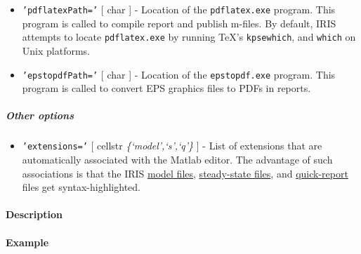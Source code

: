\begin{itemize}
\item
  \texttt{'pdflatexPath='} {[} char {]} - Location of the
  \texttt{pdflatex.exe} program. This program is called to compile
  report and publish m-files. By default, IRIS attempts to locate
  \texttt{pdflatex.exe} by running TeX's \texttt{kpsewhich}, and
  \texttt{which} on Unix platforms.
\item
  \texttt{'epstopdfPath='} {[} char {]} - Location of the
  \texttt{epstopdf.exe} program. This program is called to convert EPS
  graphics files to PDFs in reports.
\end{itemize}

\subparagraph{Other options}\label{other-options}

\begin{itemize}
\itemsep1pt\parskip0pt
\item
  \texttt{'extensions='} {[} cellstr \textbar{}
  \emph{\{`model',`s',`q'\}} {]} - List of extensions that are
  automatically associated with the Matlab editor. The advantage of such
  associations is that the IRIS \href{modellang/Contents}{model files},
  \href{sstatelang/Contents}{steady-state files}, and
  \href{qreport/Contents}{quick-report} files get syntax-highlighted.
\end{itemize}

\paragraph{Description}\label{description}

\paragraph{Example}\label{example}


